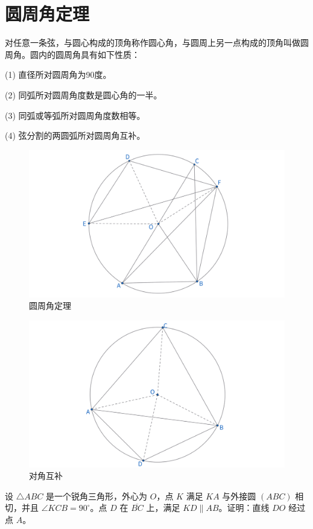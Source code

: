 \newpage 
\section{圆周角定理}
\begin{theorem}[圆周角定理]
    对任意一条弦，与圆心构成的顶角称作圆心角，与圆周上另一点构成的顶角叫做圆周角。圆内的圆周角具有如下性质：
    
    (1) 直径所对圆周角为90度。
    
    (2) 同弧所对圆周角度数是圆心角的一半。
    
    (3) 同弧或等弧所对圆周角度数相等。

    (4) 弦分割的两圆弧所对圆周角互补。
\end{theorem}
\begin{figure}[H]
    \centering
    \includegraphics[width=0.8\linewidth]{figures/圆周角定理.png}
    \caption{圆周角定理}
\end{figure}
\begin{figure}[H]
    \centering
    \includegraphics[width=0.8\linewidth]{figures/圆周角定理-对角互补.png}
    \caption{对角互补}
\end{figure}


\begin{exercise}
设 $\triangle ABC$ 是一个锐角三角形，外心为 $O$，点 $K$ 满足 $KA$ 与外接圆 $(ABC)$ 相切，并且 $\angle KCB = 90^\circ$。点 $D$ 在 $\overline{BC}$ 上，满足 $KD \parallel AB$。证明：直线 $DO$ 经过点 $A$。
\end{exercise}



